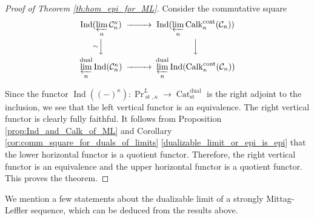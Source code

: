 \documentclass[11pt,leqno]{amsart}
\numberwithin{equation}{section}
\newcommand{\prolim}[1][]{\mathop{\varprojlim}\limits_{#1}}
\newcommand{\Cat}{\operatorname{Cat}}
\newcommand{\cont}{\operatorname{cont}}
\newcommand{\st}{\operatorname{st}}
\newcommand{\dual}{\operatorname{dual}}
\newcommand{\cC}{{\mathcal C}}
\newcommand{\Ind}{\operatorname{Ind}}
\newcommand{\Calk}{\operatorname{Calk}}
\begin{document}
\begin{proof}[Proof of Theorem \ref{th:hom_epi_for_ML}] Consider the commutative square
\begin{equation*}
\begin{CD}
\Ind(\prolim[n]\cC_n^{\kappa}) @>>> \Ind(\prolim[n]\Calk_{\kappa}^{\cont}(\cC_n))\\
@V{\sim}VV @VVV\\
\prolim[n]^{\dual}\Ind(\cC_n^{\kappa}) @>>> \prolim[n]^{\dual}\Ind(\Calk_{\kappa}^{\cont}(\cC_n))
\end{CD}		
\end{equation*}

Since the functor $\Ind((-)^{\kappa}):\Pr^L_{\st,\kappa}\to\Cat_{\st}^{\dual}$ is the right adjoint to the inclusion, we see that the left vertical functor is an equivalence. The right vertical functor is clearly fully faithful. It follows from Proposition \ref{prop:Ind_and_Calk_of_ML} and Corollary \ref{cor:comm_square_for_duals_of_limits} \ref{dualizable_limit_or_epi_is_epi} that the lower horizontal functor is a quotient functor. Therefore, the right vertical functor is an equivalence and the upper horizontal functor is a quotient functor. This proves the theorem.
\end{proof}

We mention a few statements about the dualizable limit of a strongly Mittag-Leffler sequence, which can be deduced from the results above.
\end{document}
